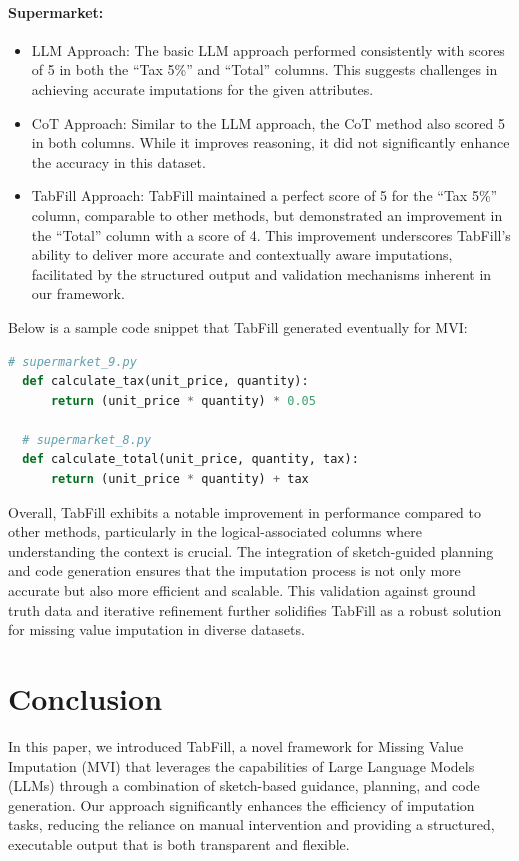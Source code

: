 \documentclass[sigconf]{acmart}
\begin{document}
\paragraph{Supermarket:}
\begin{itemize}
  \item LLM Approach: The basic LLM approach performed consistently with scores of 5 in both the “Tax 5\%” and “Total” columns. This suggests challenges in achieving accurate imputations for the given attributes.
	\item CoT Approach: Similar to the LLM approach, the CoT method also scored 5 in both columns. While it improves reasoning, it did not significantly enhance the accuracy in this dataset.
	\item	TabFill Approach: TabFill maintained a perfect score of 5 for the “Tax 5\%” column, comparable to other methods, but demonstrated an improvement in the “Total” column with a score of 4. This improvement underscores TabFill’s ability to deliver more accurate and contextually aware imputations, facilitated by the structured output and validation mechanisms inherent in our framework.
\end{itemize}


Below is a sample code snippet that TabFill generated eventually for MVI:
\begin{lstlisting}[language=Python, caption=Python function to impute missing values in Supermarket, label={code:supermarket}]
  # supermarket_9.py
  def calculate_tax(unit_price, quantity):
      return (unit_price * quantity) * 0.05
    
  # supermarket_8.py
  def calculate_total(unit_price, quantity, tax):
      return (unit_price * quantity) + tax
\end{lstlisting}


Overall, TabFill exhibits a notable improvement in performance compared to other methods, particularly in the logical-associated columns where understanding the context is crucial. The integration of sketch-guided planning and code generation ensures that the imputation process is not only more accurate but also more efficient and scalable. This validation against ground truth data and iterative refinement further solidifies TabFill as a robust solution for missing value imputation in diverse datasets.


\section{Conclusion}
In this paper, we introduced TabFill, a novel framework for Missing Value Imputation (MVI) that leverages the capabilities of Large Language Models (LLMs) through a combination of sketch-based guidance, planning, and code generation. Our approach significantly enhances the efficiency of imputation tasks, reducing the reliance on manual intervention and providing a structured, executable output that is both transparent and flexible.
\end{document}
